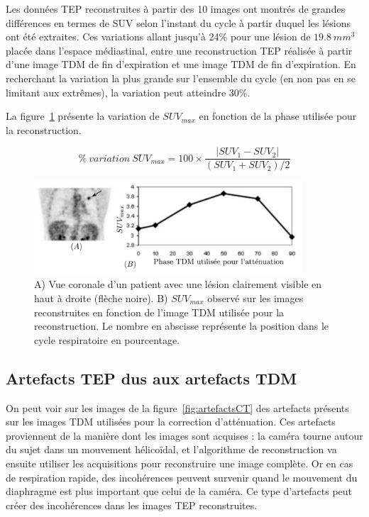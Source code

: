 Les données TEP reconstruites à partir des 10 images ont montrés de grandes différences en termes de SUV selon l'instant du cycle à partir duquel les lésions ont été extraites.
Ces variations allant jusqu'à 24\% pour une lésion de $19.8~mm^3$ placée dans l'espace médiastinal, entre une reconstruction TEP réalisée à partir d'une image TDM de fin d'expiration et une image TDM de fin d'expiration. En recherchant la variation la plus grande sur l'ensemble du cycle (en non pas en se limitant aux extrêmes), la variation peut atteindre 30\%.

La figure~\ref{fig:lesionEnFctPhaseTDM} présente la variation de $SUV_{max}$ en fonction de la phase utilisée pour la reconstruction.

\begin{equation}
\label{eq:varSUV}
 \%~variation~SUV_{max} = 100 \times \frac{ | SUV_1 - SUV_2 | }{ (SUV_1 + SUV_2) / 2 }
\end{equation}

\begin{figure}[h!]
	\vspace{0.5cm}
	\centering
			\includegraphics[width=10cm]{images/lesionEnFctPhaseTDM}
	\vspace{-0.5cm}
	\caption{A) Vue coronale d'un patient avec une lésion clairement visible en haut à droite (flèche noire).  B) $SUV_{max}$ observé sur les images reconstruites en fonction de l'image TDM utilisée pour la reconstruction. Le nombre en abscisse représente la position dans le cycle respiratoire en pourcentage.} 
	\label{fig:lesionEnFctPhaseTDM}
\end{figure}

\subsection{Artefacts TEP dus aux artefacts TDM}

On peut voir sur les images de la figure~\ref{fig:artefactsCT} des artefacts présents sur les images TDM utilisées pour la correction d'atténuation. Ces artefacts proviennent de la manière dont les images sont acquises : la caméra tourne autour du sujet dans un mouvement hélicoïdal, et l'algorithme de reconstruction va ensuite utiliser les acquisitions pour reconstruire une image complète. Or en cas de respiration rapide, des incohérences peuvent survenir quand le mouvement du diaphragme est plus important que celui de la caméra. Ce type d'artefacts peut créer des incohérences dans les images TEP reconstruites.

